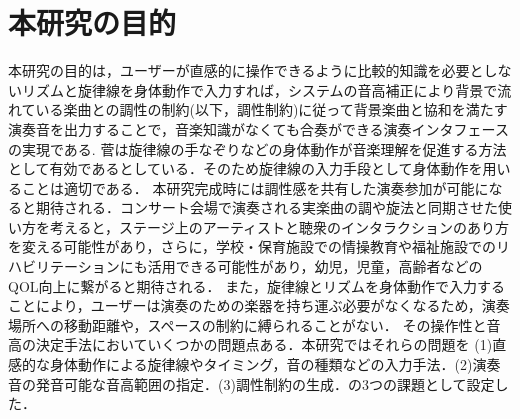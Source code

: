 \section{本研究の目的}
本研究の目的は，ユーザーが直感的に操作できるように比較的知識を必要としないリズムと旋律線を身体動作で入力すれば，システムの音高補正により背景で流れている楽曲との調性の制約(以下，調性制約)に従って背景楽曲と協和を満たす演奏音を出力することで，音楽知識がなくても合奏ができる演奏インタフェースの実現である. 菅\cite{suga2008}は旋律線の手なぞりなどの身体動作が音楽理解を促進する方法として有効であるとしている．そのため旋律線の入力手段として身体動作を用いることは適切である．
本研究完成時には調性感を共有した演奏参加が可能になると期待される．コンサート会場で演奏される実楽曲の調や旋法と同期させた使い方を考えると，ステージ上のアーティストと聴衆のインタラクションのあり方を変える可能性があり，さらに，学校・保育施設での情操教育や福祉施設でのリハビリテーションにも活用できる可能性があり，幼児，児童，高齢者などのQOL向上に繋がると期待される．
また，旋律線とリズムを身体動作で入力することにより，ユーザーは演奏のための楽器を持ち運ぶ必要がなくなるため，演奏場所への移動距離や，スペースの制約に縛られることがない．
その操作性と音高の決定手法においていくつかの問題点ある．本研究ではそれらの問題を
(1)直感的な身体動作による旋律線やタイミング，音の種類などの入力手法．(2)演奏音の発音可能な音高範囲の指定．(3)調性制約の生成．の3つの課題として設定した．
